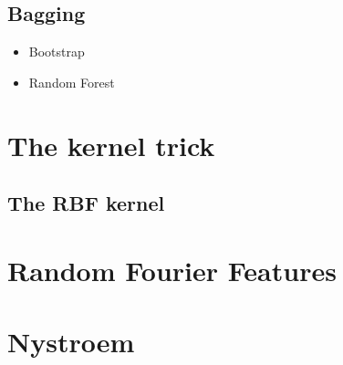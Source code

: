   \subsection{Bagging}
    \begin{note}
      \begin{itemize}
        \item Bootstrap
        \item Random Forest
      \end{itemize}
    \end{note}

\section{The kernel trick}
  \subsection{The RBF kernel}

\section{Random Fourier Features}
\section{Nystroem}
